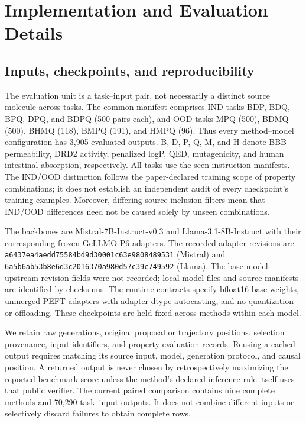 \section{Implementation and Evaluation Details}
\label{app:implementation}

\subsection{Inputs, checkpoints, and reproducibility}
The evaluation unit is a task--input pair, not necessarily a distinct source molecule across tasks. The common manifest comprises IND tasks BDP, BDQ, BPQ, DPQ, and BDPQ (500 pairs each), and OOD tasks MPQ (500), BDMQ (500), BHMQ (118), BMPQ (191), and HMPQ (96). Thus every method--model configuration has 3,905 evaluated outputs. B, D, P, Q, M, and H denote BBB permeability, DRD2 activity, penalized logP, QED, mutagenicity, and human intestinal absorption, respectively. All tasks use the seen-instruction manifests. The IND/OOD distinction follows the paper-declared training scope of property combinations; it does not establish an independent audit of every checkpoint's training examples. Moreover, differing source inclusion filters mean that IND/OOD differences need not be caused solely by unseen combinations.

The backbones are Mistral-7B-Instruct-v0.3 and Llama-3.1-8B-Instruct with their corresponding frozen GeLLMO-P6 adapters. The recorded adapter revisions are \nolinkurl{a6437ea4aedd75584bd9d30001c63e9808489531} (Mistral) and \nolinkurl{6a5b6ab53b8e6d3c2016370a980d57c39c749592} (Llama). The base-model upstream revision fields were not recorded; local model files and source manifests are identified by checksums. The runtime contracts specify bfloat16 base weights, unmerged PEFT adapters with adapter dtype autocasting, and no quantization or offloading. These checkpoints are held fixed across methods within each model.

We retain raw generations, original proposal or trajectory positions, selection provenance, input identifiers, and property-evaluation records. Reusing a cached output requires matching its source input, model, generation protocol, and causal position. A returned output is never chosen by retrospectively maximizing the reported benchmark score unless the method's declared inference rule itself uses that public verifier. The current paired comparison contains nine complete methods and 70,290 task--input outputs. It does not combine different inputs or selectively discard failures to obtain complete rows.

